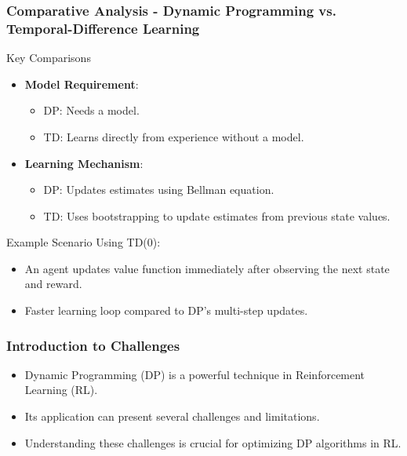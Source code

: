 \documentclass[aspectratio=169]{beamer}
\begin{document}
\begin{frame}[fragile]
  \frametitle{Comparative Analysis - Dynamic Programming vs. Temporal-Difference Learning}
  \begin{block}{Key Comparisons}
      \begin{itemize}
          \item \textbf{Model Requirement}:
              \begin{itemize}
                  \item DP: Needs a model.
                  \item TD: Learns directly from experience without a model.
              \end{itemize}

          \item \textbf{Learning Mechanism}:
              \begin{itemize}
                  \item DP: Updates estimates using Bellman equation.
                  \item TD: Uses bootstrapping to update estimates from previous state values.
              \end{itemize}
      \end{itemize}
  \end{block}

  \begin{block}{Example Scenario}
      Using TD(0):
      \begin{itemize}
          \item An agent updates value function immediately after observing the next state and reward.
          \item Faster learning loop compared to DP's multi-step updates.
      \end{itemize}
  \end{block}
\end{frame}

\begin{frame}
    \titlepage
\end{frame}

\begin{frame}
    \frametitle{Introduction to Challenges}
    \begin{itemize}
        \item Dynamic Programming (DP) is a powerful technique in Reinforcement Learning (RL).
        \item Its application can present several challenges and limitations.
        \item Understanding these challenges is crucial for optimizing DP algorithms in RL.
    \end{itemize}
\end{frame}
\end{document}
